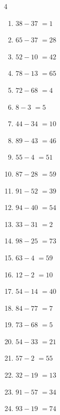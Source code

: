 \begin{multicols}{4}
\begin{enumerate}
  \item $38-37$
        $=1$

  \item $65-37$
        $=28$

  \item $52-10$
        $=42$

  \item $78-13$
        $=65$

  \item $72-68$
        $=4$

  \item $8-3$
        $=5$

  \item $44-34$
        $=10$

  \item $89-43$
        $=46$

  \item $55-4$
        $=51$

  \item $87-28$
        $=59$

  \item $91-52$
        $=39$

  \item $94-40$
        $=54$

  \item $33-31$
        $=2$

  \item $98-25$
        $=73$

  \item $63-4$
        $=59$

  \item $12-2$
        $=10$

  \item $54-14$
        $=40$

  \item $84-77$
        $=7$

  \item $73-68$
        $=5$

  \item $54-33$
        $=21$

  \item $57-2$
        $=55$

  \item $32-19$
        $=13$

  \item $91-57$
        $=34$

  \item $93-19$
        $=74$


\end{enumerate}
\end{multicols}
